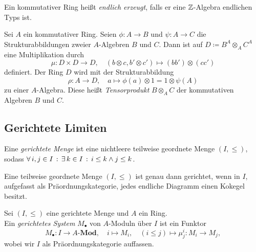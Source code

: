 \documentclass{cheat-sheet}
\newcommand{\Mod}{\mathbf{Mod}} %
\newcommand{\LMod}[1]{{#1}\text{-}\Mod} %
\begin{document}
\begin{defn}
  Ein kommutativer Ring heißt \emph{endlich erzeugt}, falls er eine $\mathbb{Z}$-Algebra endlichen Typs ist.
\end{defn}



\begin{defn}
  Sei $A$ ein kommutativer Ring.
  Seien $\phi : A \to B$ und $\psi : A \to C$ die Strukturabbildungen zweier $A$-Algebren $B$ und $C$.
  Dann ist auf $D \coloneqq B^A \otimes_A C^A$ eine Multiplikation durch
  \[
    \mu : D \times D \to D, \quad (b \otimes c, b' \otimes c') \mapsto (b b') \otimes (c c')
  \]
  definiert.
  Der Ring $D$ wird mit der Strukturabbildung
  \[
    \rho : A \to D, \quad a \mapsto \phi(a) \otimes 1 = 1 \otimes \psi(A)
  \]
  zu einer $A$-Algebra.
  Diese heißt \emph{Tensorprodukt} $B \otimes_A C$ der kommutativen Algebren $B$ und $C$.
\end{defn}

\subsection{Gerichtete Limiten}


\begin{defn}
  Eine \emph{gerichtete Menge} ist eine nichtleere teilweise geordnete Menge $(I, \leq)$, sodass $\forall \, {i, j \in I} \,:\, \exists \, {k \in I} \,:\, i \leq k \wedge j \leq k$.
\end{defn}

\begin{bem}
  Eine teilweise geordnete Menge $(I, \leq)$ ist genau dann gerichtet, wenn in $I$, aufgefasst als Präordnungskategorie, jedes endliche Diagramm einen Kokegel besitzt.
\end{bem}

\begin{defn}
  Sei $(I, \leq)$ eine gerichtete Menge und $A$ ein Ring. \\
  Ein \emph{gerichtetes System} $M_\bullet$ von $A$-Moduln über $I$ ist ein Funktor
  \[
    M_\bullet : I \to \LMod{A}, \quad i \mapsto M_i, \quad (i \leq j) \mapsto \mu^i_j : M_i \to M_j,
  \]
  wobei wir $I$ als Präordnungskategorie auffassen.
\end{defn}
\end{document}
